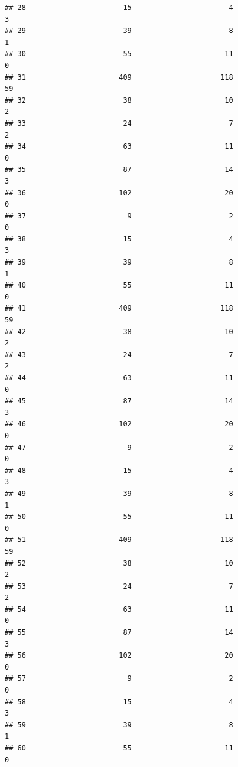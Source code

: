 \documentclass[
]{article}
\begin{document}
\begin{verbatim}
## 28                       15                       4                        3
## 29                       39                       8                        1
## 30                       55                      11                        0
## 31                      409                     118                       59
## 32                       38                      10                        2
## 33                       24                       7                        2
## 34                       63                      11                        0
## 35                       87                      14                        3
## 36                      102                      20                        0
## 37                        9                       2                        0
## 38                       15                       4                        3
## 39                       39                       8                        1
## 40                       55                      11                        0
## 41                      409                     118                       59
## 42                       38                      10                        2
## 43                       24                       7                        2
## 44                       63                      11                        0
## 45                       87                      14                        3
## 46                      102                      20                        0
## 47                        9                       2                        0
## 48                       15                       4                        3
## 49                       39                       8                        1
## 50                       55                      11                        0
## 51                      409                     118                       59
## 52                       38                      10                        2
## 53                       24                       7                        2
## 54                       63                      11                        0
## 55                       87                      14                        3
## 56                      102                      20                        0
## 57                        9                       2                        0
## 58                       15                       4                        3
## 59                       39                       8                        1
## 60                       55                      11                        0

\end{verbatim}
\end{document}
